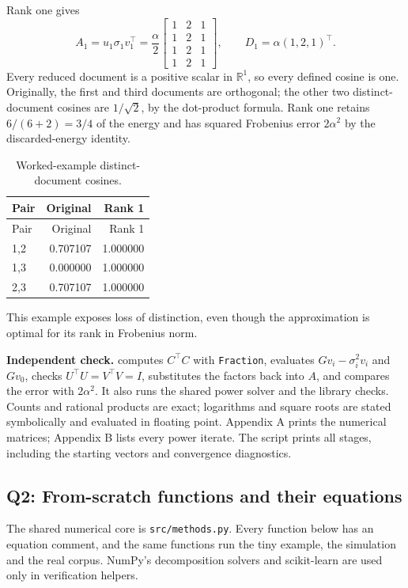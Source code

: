 \documentclass[11pt]{article}
\renewcommand{\arraystretch}{1.15}
\newcommand{\R}{\mathbb{R}}
\begin{document}
Rank one gives
\[
A_1=u_1\sigma_1v_1^\top
=\frac{\alpha}{2}\begin{bmatrix}1&2&1\\1&2&1\\1&2&1\\1&2&1\end{bmatrix},
\qquad D_1=\alpha(1,2,1)^\top.
\]
Every reduced document is a positive scalar in $\R^1$, so every defined
cosine is one. Originally, the first and third documents are orthogonal;
the other two distinct-document cosines are $1/\sqrt2$, by the dot-product
formula. Rank one retains $6/(6+2)=3/4$ of the energy and has squared
Frobenius error $2\alpha^2$ by the discarded-energy identity.
{\small\renewcommand{\arraystretch}{1.05}
\begin{longtable}{lrr}
\caption{Worked-example distinct-document cosines.}\\
\toprule
Pair & Original & Rank 1 \\ \midrule\endfirsthead
\toprule
Pair & Original & Rank 1 \\ \midrule\endhead
1,2 & 0.707107 & 1.000000 \\
1,3 & 0.000000 & 1.000000 \\
2,3 & 0.707107 & 1.000000 \\
\bottomrule
\end{longtable}
}

This example exposes loss of distinction, even though the approximation is
optimal for its rank in Frobenius norm.

\textbf{Independent check.}  computes $C^\top C$
with \texttt{Fraction}, evaluates $Gv_i-\sigma_i^2v_i$ and $Gv_0$,
checks $U^\top U=V^\top V=I$, substitutes the factors back into $A$,
and compares the error with $2\alpha^2$. It also runs the shared power
solver and the library checks. Counts and rational products are exact;
logarithms and square roots are stated symbolically and evaluated in
floating point. Appendix A prints the numerical matrices; Appendix B
lists every power iterate. The script prints all stages, including
the starting vectors and convergence diagnostics.

\subsection{Q2: From-scratch functions and their equations}
The shared numerical core is \texttt{src/methods.py}. Every function below
has an equation comment, and the same functions run the tiny example,
the simulation and the real corpus. NumPy's decomposition solvers and
scikit-learn are used only in verification helpers.
\end{document}
